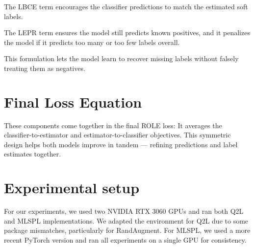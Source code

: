 \documentclass[12pt,a4paper]{article}
\begin{document}
The LBCE term encourages the classifier predictions to match the estimated soft labels.

The LEPR term ensures the model still predicts known positives, and it penalizes the model if it predicts too many or too few labels overall.

This formulation lets the model learn to recover missing labels without falsely treating them as negatives.








\section*{Final Loss Equation}
These components come together in the final ROLE loss:
It averages the classifier-to-estimator and estimator-to-classifier objectives.
This symmetric design helps both models improve in tandem — refining predictions and label estimates together.


\section*{Experimental setup}
For our experiments, we used two NVIDIA RTX 3060 GPUs and ran both Q2L and MLSPL implementations.
We adapted the environment for Q2L due to some package mismatches, particularly for RandAugment.
For MLSPL, we used a more recent PyTorch version and ran all experiments on a single GPU for consistency.
\end{document}
